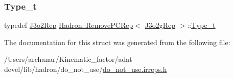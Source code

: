 \mbox{\label{structHadron_1_1RemovePCRep_3_01J3o2gRep_01_4_aa50bb0d4b58454b97bf8e9a4d3eb0a1b}} 
\subsubsection{\texorpdfstring{Type\_t}{Type\_t}\hspace{0.1cm}{\footnotesize\ttfamily [2/2]}}
{\footnotesize\ttfamily typedef \mbox{\hyperlink{structHadron_1_1J3o2Rep}{J3o2\+Rep}} \mbox{\hyperlink{structHadron_1_1RemovePCRep}{Hadron\+::\+Remove\+P\+C\+Rep}}$<$ \mbox{\hyperlink{structHadron_1_1J3o2gRep}{J3o2g\+Rep}} $>$\+::\mbox{\hyperlink{structHadron_1_1RemovePCRep_3_01J3o2gRep_01_4_aa50bb0d4b58454b97bf8e9a4d3eb0a1b}{Type\+\_\+t}}}



The documentation for this struct was generated from the following file\+:\begin{DoxyCompactItemize}
\item 
/\+Users/archanar/\+Kinematic\+\_\+factor/adat-\/devel/lib/hadron/do\+\_\+not\+\_\+use/\mbox{\hyperlink{adat-devel_2lib_2hadron_2do__not__use_2do__not__use_8irreps_8h}{do\+\_\+not\+\_\+use.\+irreps.\+h}}\end{DoxyCompactItemize}
